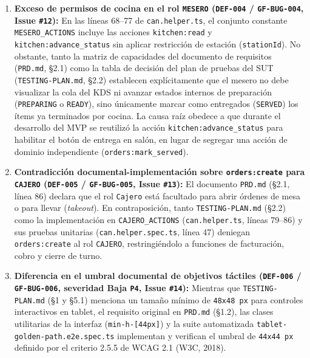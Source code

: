 \documentclass[stu,12pt,a4paper]{apa7}
\providecommand{\tightlist}{\setlength{\itemsep}{0pt}\setlength{\parskip}{0pt}}
\begin{document}
\begin{enumerate}
\def\labelenumi{\arabic{enumi}.}
\tightlist
\item
  \textbf{Exceso de permisos de cocina en el rol \texttt{MESERO} (\texttt{DEF-{}\allowbreak{}004} / \texttt{GF-{}\allowbreak{}BUG-{}\allowbreak{}004}, Issue \texttt{\#12}):} En las líneas 68--77 de \texttt{can.\allowbreak{}helper.\allowbreak{}ts}, el conjunto constante \texttt{MESERO\_\allowbreak{}ACTIONS} incluye las acciones \texttt{\textquotesingle{}kitchen:\allowbreak{}read\textquotesingle{}} y \texttt{\textquotesingle{}kitchen:\allowbreak{}advance\_\allowbreak{}status\textquotesingle{}} sin aplicar restricción de estación (\texttt{stationId}). No obstante, tanto la matriz de capacidades del documento de requisitos (\texttt{PRD.\allowbreak{}md}, §2.1) como la tabla de decisión del plan de pruebas del SUT (\texttt{TESTING-{}\allowbreak{}PLAN.\allowbreak{}md}, §2.2) establecen explícitamente que el mesero no debe visualizar la cola del KDS ni avanzar estados internos de preparación (\texttt{PREPARING} o \texttt{READY}), sino únicamente marcar como entregados (\texttt{SERVED}) los ítems ya terminados por cocina. La causa raíz obedece a que durante el desarrollo del MVP se reutilizó la acción \texttt{\textquotesingle{}kitchen:\allowbreak{}advance\_\allowbreak{}status\textquotesingle{}} para habilitar el botón de entrega en salón, en lugar de segregar una acción de dominio independiente (\texttt{\textquotesingle{}orders:\allowbreak{}mark\_\allowbreak{}served\textquotesingle{}}).
\item
  \textbf{Contradicción documental-implementación sobre \texttt{orders:\allowbreak{}create} para \texttt{CAJERO} (\texttt{DEF-{}\allowbreak{}005} / \texttt{GF-{}\allowbreak{}BUG-{}\allowbreak{}005}, Issue \texttt{\#13}):} El documento \texttt{PRD.\allowbreak{}md} (§2.1, línea 86) declara que el rol \texttt{Cajero} está facultado para abrir órdenes de mesa o para llevar (\emph{takeout}). En contraposición, tanto \texttt{TESTING-{}\allowbreak{}PLAN.\allowbreak{}md} (§2.2) como la implementación en \texttt{CAJERO\_\allowbreak{}ACTIONS} (\texttt{can.\allowbreak{}helper.\allowbreak{}ts}, líneas 79--86) y sus pruebas unitarias (\texttt{can.\allowbreak{}helper.\allowbreak{}spec.\allowbreak{}ts}, línea 47) deniegan \texttt{\textquotesingle{}orders:\allowbreak{}create\textquotesingle{}} al rol \texttt{CAJERO}, restringiéndolo a funciones de facturación, cobro y cierre de turno.
\item
  \textbf{Diferencia en el umbral documental de objetivos táctiles (\texttt{DEF-{}\allowbreak{}006} / \texttt{GF-{}\allowbreak{}BUG-{}\allowbreak{}006}, severidad Baja \texttt{P4}, Issue \texttt{\#14}):} Mientras que \texttt{TESTING-{}\allowbreak{}PLAN.\allowbreak{}md} (§1 y §5.1) menciona un tamaño mínimo de \texttt{48x48 px} para controles interactivos en tablet, el requisito original en \texttt{PRD.\allowbreak{}md} (§1.2), las clases utilitarias de la interfaz (\texttt{min-{}\allowbreak{}h-{}\allowbreak{}[\allowbreak{}44px]\allowbreak{}}) y la suite automatizada \texttt{tablet-{}\allowbreak{}golden-{}\allowbreak{}path.\allowbreak{}e2e.\allowbreak{}spec.\allowbreak{}ts} implementan y verifican el umbral de \texttt{44x44 px} definido por el criterio 2.5.5 de WCAG 2.1 (W3C, 2018).

\end{enumerate}
\end{document}
